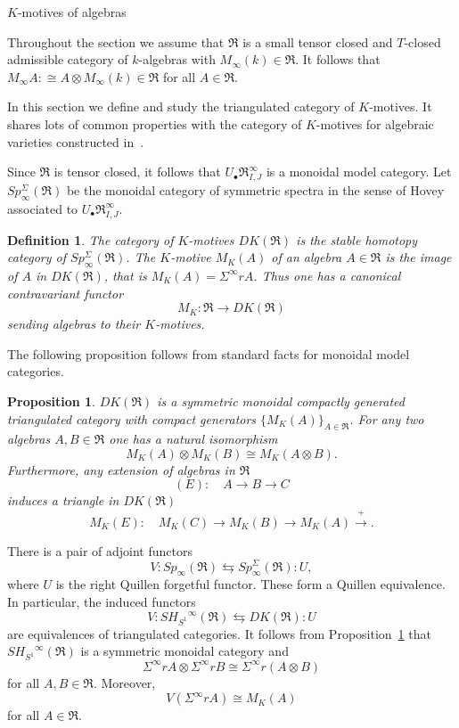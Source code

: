 \documentclass[11pt,reqno,a4paper]{amsart}
\newtheorem{prop}[thm]{Proposition}
\newtheorem*{defs}{Definition}
\begin{document}
{}{$K$-motives of algebras}

Throughout the section we assume that $\Re$ is a small tensor closed
and $T$-closed admissible category of $k$-algebras with
$M_\infty(k)\in\Re$. It follows that $M_\infty A:\cong A\otimes
M_\infty(k)\in\Re$ for all $A\in\Re$.

In this section we define and study the triangulated category of
$K$-motives. It shares lots of common properties with the category
of $K$-motives for algebraic varieties constructed in~\cite{GP}.

Since $\Re$ is tensor closed, it follows that
$U_\bullet\Re_{I,J}^{\infty}$ is a monoidal model category. Let
$Sp_\infty^\Sigma(\Re)$ be the monoidal category of symmetric
spectra in the sense of Hovey~\cite{H} associated to
$U_\bullet\Re_{I,J}^{\infty}$.

\begin{defs}{\rm
The {\it category of $K$-motives $DK(\Re)$} is the stable homotopy
category of $Sp_\infty^\Sigma(\Re)$. The {\it $K$-motive\/} $M_K(A)$
of an algebra $A\in\Re$ is the image of $A$ in $DK(\Re)$, that is
$M_K(A)=\Sigma^\infty rA$. Thus one has a canonical contravariant
functor
   $$M_K:\Re\to DK(\Re)$$
sending algebras to their $K$-motives.

}\end{defs}

The following proposition follows from standard facts for monoidal
model categories.

\begin{prop}\label{kmo}
$DK(\Re)$ is a symmetric monoidal compactly generated triangulated
category with compact generators $\{M_K(A)\}_{A\in\Re}$. For any two
algebras $A,B\in\Re$ one has a natural isomorphism
   $$M_K(A)\otimes M_K(B)\cong M_K(A\otimes B).$$
Furthermore, any extension of algebras in $\Re$
   $$(E):\quad A\to B\to C$$
induces a triangle in $DK(\Re)$
   $$M_K(E):\quad M_K(C)\to M_K(B)\to M_K(A)\xrightarrow+.$$
\end{prop}

There is a pair of adjoint functors
    $$V:Sp_\infty(\Re)\leftrightarrows Sp_\infty^\Sigma(\Re):U,$$
where $U$ is the right Quillen forgetful functor. These form a
Quillen equivalence. In particular, the induced functors
   $$V:{SH_{S^1}}^\infty(\Re)\leftrightarrows DK(\Re):U$$
are equivalences of triangulated categories. It follows from
Proposition~\ref{kmo} that ${SH_{S^1}}^{\infty}(\Re)$ is a symmetric
monoidal category and
   $$\Sigma^\infty rA\otimes\Sigma^\infty rB\cong\Sigma^\infty r(A\otimes B)$$
for all $A,B\in\Re$. Moreover,
   $$V(\Sigma^\infty rA)\cong M_K(A)$$
for all $A\in\Re$.
\end{document}
